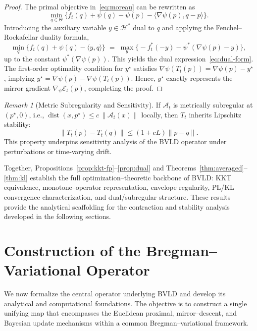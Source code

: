 \documentclass[11pt]{article}
\newcommand{\Ecal}{\mathcal{E}}
\newcommand{\inner}[2]{\langle #1 , #2 \rangle}
\theoremstyle{plain}
\theoremstyle{definition}
\theoremstyle{remark}
\newtheorem{remark}[theorem]{Remark}
\begin{document}
\begin{proof}
The primal objective in~\eqref{eq:moreau} can be rewritten as
\[
\min_{q\in\Theta}
\bigl\{
f_t(q)+\psi(q)-\psi(p)-\inner{\nabla\psi(p)}{q-p}
\bigr\}.
\]
Introducing the auxiliary variable $y\in\mathcal H^*$ dual to $q$ and applying the Fenchel--Rockafellar duality formula,
\[
\min_{q}\{f_t(q)+\psi(q)-\inner{y}{q}\}
\;=\;
\max_{y}\bigl\{-f_t^*(-y)-\psi^*(\nabla\psi(p)-y)\bigr\},
\]
up to the constant $\psi^*(\nabla\psi(p))$.
This yields the dual expression~\eqref{eq:dual-form}.
The first-order optimality condition for $y^\star$ satisfies
$\nabla\psi(T_t(p))=\nabla\psi(p)-y^\star$,
implying
$y^\star=\nabla\psi(p)-\nabla\psi(T_t(p))$.
Hence, $y^\star$ exactly represents the mirror gradient $\nabla_\psi \Ecal_t(p)$, completing the proof.
\end{proof}






\begin{remark}[Metric Subregularity and Sensitivity]
\label{rem:subreg}
If $\mathcal A_t$ is metrically subregular at $(p^\star,0)$, i.e.,
$\operatorname{dist}(x,p^\star)\le c\,\|\mathcal A_t(x)\|$ locally, 
then $T_t$ inherits Lipschitz stability:
\[
\|T_t(p)-T_t(q)\|\le (1+\!cL)\|p-q\|.
\]
This property underpins sensitivity analysis of the BVLD operator 
under perturbations or time‐varying drift.
\end{remark}

\medskip
\noindent
Together, Propositions~\ref{prop:kkt-fp}–\ref{prop:dual} and 
Theorems~\ref{thm:averaged}–\ref{thm:kl} 
establish the full optimization–theoretic backbone of BVLD: 
KKT equivalence, monotone–operator representation, envelope regularity, 
PL/KL convergence characterization, and dual/subregular structure.  
These results provide the analytical scaffolding for the contraction and 
stability analysis developed in the following sections.


\section{Construction of the Bregman--Variational Operator}
\label{sec:operator}

We now formalize the central operator underlying BVLD and 
develop its analytical and computational foundations.  
The objective is to construct a single unifying map that 
encompasses the Euclidean proximal, mirror--descent, and 
Bayesian update mechanisms within a common Bregman--variational framework.
\end{document}
